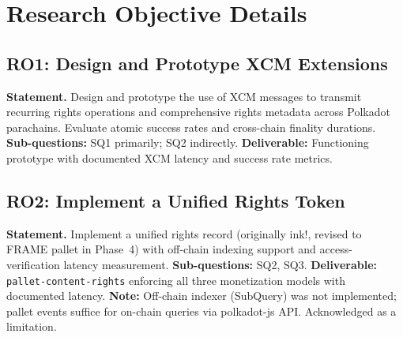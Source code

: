 
\chapter{Research Objective Details}\label{app:objectives}

\section{RO1: Design and Prototype XCM Extensions}

\textbf{Statement.} Design and prototype the use of XCM messages to transmit recurring rights operations and comprehensive rights metadata across Polkadot parachains. Evaluate atomic success rates and cross-chain finality durations.\newline
\textbf{Sub-questions:} SQ1 primarily; SQ2 indirectly.\newline
\textbf{Deliverable:} Functioning prototype with documented XCM latency and success rate metrics.

\section{RO2: Implement a Unified Rights Token}

\textbf{Statement.} Implement a unified rights record (originally ink!, revised to FRAME pallet in Phase~4) with off-chain indexing support and access-verification latency measurement.\newline
\textbf{Sub-questions:} SQ2, SQ3.\newline
\textbf{Deliverable:} \texttt{pallet-content-rights} enforcing all three monetization models with documented latency.\newline
\textbf{Note:} Off-chain indexer (SubQuery) was not implemented; pallet events suffice for on-chain queries via polkadot-js API. Acknowledged as a limitation.

